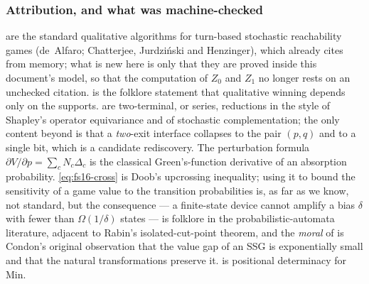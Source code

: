 \subsubsection*{Attribution, and what was machine-checked}

\begin{remark}\label{rem:fs16-prior}
 are the standard qualitative
algorithms for turn-based stochastic reachability games (de~Alfaro;
Chatterjee, Jurdzi\'nski and Henzinger), which  already
cites from memory; what is new here is only that they are proved inside this
document's model, so that the computation of $Z_0$ and $Z_1$ no longer rests on
an unchecked citation.  is the folklore statement that
qualitative winning depends only on the supports.
 are two-terminal, or series, reductions
in the style of Shapley's operator equivariance and of stochastic
complementation; the only content beyond  is that a
\emph{two}-exit interface collapses to the pair $(p,q)$ and to a single bit,
which is a candidate rediscovery. The perturbation formula
$\partial V/\partial p=\sum_cN_c\Delta_c$ is the classical Green's-function
derivative of an absorption probability. \eqref{eq:fs16-cross} is Doob's
upcrossing inequality; using it to bound the sensitivity of a game value to the
transition probabilities is, as far as we know, not standard, but the
consequence --- a finite-state device cannot amplify a bias $\delta$ with fewer
than $\Omega(1/\delta)$ states --- is folklore in the probabilistic-automata
literature, adjacent to Rabin's isolated-cut-point theorem, and the
\emph{moral} of  is Condon's original observation that the
value gap of an SSG is exponentially small and that the natural transformations
preserve it.  is positional determinacy for Min.
\end{remark}

